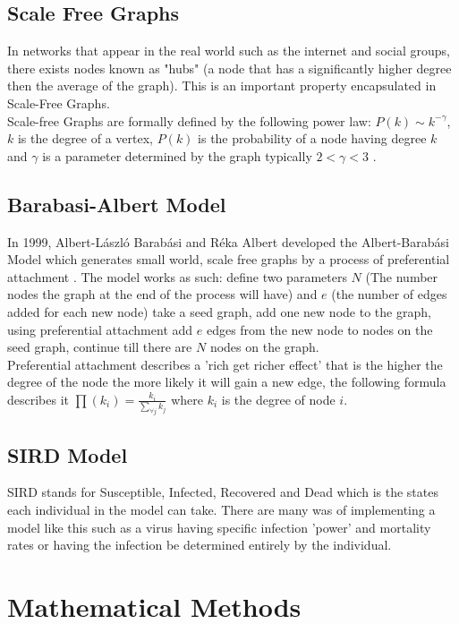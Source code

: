 \documentclass{article}
\begin{document}
        \subsection{Scale Free Graphs}
        In networks that appear in the real world such as the internet and social groups, there exists nodes known as "hubs" (a node that has a  significantly higher degree then the average of the graph). This is an important property encapsulated in Scale-Free Graphs.\\ 
        Scale-free Graphs are formally defined by the following power law: $P(k) \sim  k^{-\gamma }$, $k$ is the degree of a vertex, $P(k)$ is the probability of a node having degree $k$ and $\gamma$ is a parameter determined by the graph typically $2<\gamma<3$ \parencite{onnela2007structure}.

        \subsection{Barabasi-Albert Model}
        In 1999, Albert-László Barabási and Réka Albert developed the Albert-Barabási Model which generates small world, scale free graphs by a process of preferential attachment \parencite{barabasi1999emergence}. The model works as such: define two parameters $N$ (The number nodes the graph at the end of the process will have) and $e$ (the number of edges added for each new node) take a seed graph, add one new node to the graph, using preferential attachment add $e$ edges from the new node to nodes on the seed graph, continue till there are $N$ nodes on the graph.\\
        Preferential attachment describes a 'rich get richer effect' that is the higher the degree of the node the more likely it will gain a new edge, the following formula describes it $\prod (k_{i}) = \frac{k_{i}}{\sum_{\forall j} {k_{j}}}$ where $k_{i}$ is the degree of node $i$. 
        \subsection{SIRD Model}
        SIRD stands for Susceptible, Infected, Recovered and Dead which is the states each individual in the model can take. There are many was of implementing a model like this such as a virus having specific infection 'power' and mortality rates or having the infection be determined entirely by the individual.
    \section{Mathematical Methods}
\end{document}
